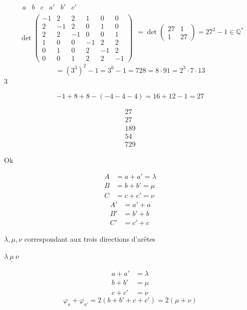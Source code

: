 \documentclass[11pt,a4paper]{article}
\begin{document}
\[
\begin{array}{c}
\begin{array}{cccccc} a & b & c & a' & b' & c' \end{array}\\
\det\left(\begin{array}{ccc|ccc}
-1 & 2 & 2 & 1 & 0 & 0\\
2 & -1 & 2 & 0 & 1 & 0\\
2 & 2 & -1 & 0 & 0 & 1\\
\hline
1 & 0 & 0 & -1 & 2 & 2\\
0 & 1 & 0 & 2 & -1 & 2\\
0 & 0 & 1 & 2 & 2 & -1
\end{array}\right)
\end{array}
= \det\begin{pmatrix} 27 & 1\\ 1 & 27\end{pmatrix}
= 27^2 - 1 \in \mathbb{Q}^*
\]
\[
= (3^3)^2 - 1 = 3^6 - 1 = 728 = 8\cdot 91 = \boxed{2^3\cdot 7\cdot 13}
\]
 $3$

\[
-1 + 8 + 8 - (-4 - 4 - 4) = 16 + 12 - 1 = 27
\]

\struck{\ill{}}
\[
\begin{array}{r}
27\\
27\\
\hline
189\\
54\phantom{0}\\
\hline
729
\end{array}
\]

Ok

\begin{align*}
A &= a + a' = \lambda\\
B &= b + b' = \mu\\
C &= c + c' = \nu
\end{align*}
\struck{$\beta$}
\begin{align*}
A' &= a' + a\\
B' &= b' + b\\
C' &= c' + c
\end{align*}

$\boxed{\lambda, \mu, \nu}$ correspondant aux trois directions d'arêtes

$\underline{\lambda\ \mu\ \nu}$


\begin{align*}
a + a' &= \lambda\\
b + b' &= \mu\\
c + c' &= \nu
\end{align*}
\[
\varphi_a + \varphi_{a'} = 2(b + b' + c + c') = 2(\mu + \nu)
\]
\end{document}
